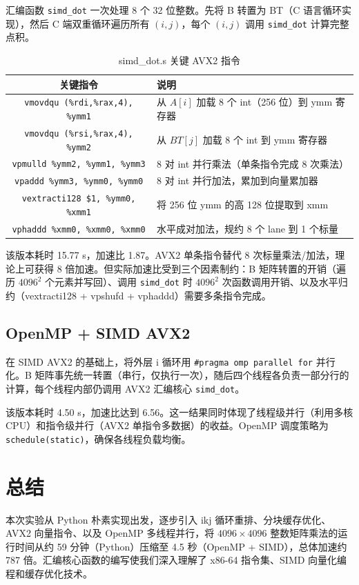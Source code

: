 \documentclass[11pt]{article}
\begin{document}
汇编函数 \texttt{simd\_dot} 一次处理 8 个 32 位整数。先将 B 转置为 BT（C 语言循环实现），然后 C 端双重循环遍历所有 $(i,j)$，每个 $(i,j)$ 调用 \texttt{simd\_dot} 计算完整点积。

\begin{table}[H]
    \centering
    \begin{tabular}{cl}
        \hline
        关键指令 & 说明 \\
        \hline
        \texttt{vmovdqu (\%rdi,\%rax,4), \%ymm1} & 从 $A[i]$ 加载 8 个 int（256 位）到 ymm 寄存器 \\
        \texttt{vmovdqu (\%rsi,\%rax,4), \%ymm2} & 从 $BT[j]$ 加载 8 个 int 到 ymm 寄存器 \\
        \texttt{vpmulld \%ymm2, \%ymm1, \%ymm3} & 8 对 int 并行乘法（单条指令完成 8 次乘法） \\
        \texttt{vpaddd \%ymm3, \%ymm0, \%ymm0} & 8 对 int 并行加法，累加到向量累加器 \\
        \texttt{vextracti128 \$1, \%ymm0, \%xmm1} & 将 256 位 ymm 的高 128 位提取到 xmm \\
        \texttt{vphaddd \%xmm0, \%xmm0, \%xmm0} & 水平成对加法，规约 8 个 lane 到 1 个标量 \\
        \hline
    \end{tabular}
    \caption{simd\_dot.s 关键 AVX2 指令}
\end{table}

该版本耗时 15.77 s，加速比 1.87。AVX2 单条指令替代 8 次标量乘法/加法，理论上可获得 8 倍加速。但实际加速比受到三个因素制约：B 矩阵转置的开销（遍历 $4096^2$ 个元素并写回）、调用 \texttt{simd\_dot} 时 $4096^2$ 次函数调用开销、以及水平归约（vextracti128 + vpshufd + vphaddd）需要多条指令完成。

\subsection{OpenMP + SIMD AVX2}
在 SIMD AVX2 的基础上，将外层 i 循环用 \texttt{\#pragma omp parallel for} 并行化。B 矩阵事先统一转置（串行，仅执行一次），随后四个线程各负责一部分行的计算，每个线程内部仍调用 AVX2 汇编核心 \texttt{simd\_dot}。

该版本耗时 4.50 s，加速比达到 6.56。这一结果同时体现了线程级并行（利用多核 CPU）和指令级并行（AVX2 单指令多数据）的收益。OpenMP 调度策略为 \texttt{schedule(static)}，确保各线程负载均衡。

\section{总结}
本次实验从 Python 朴素实现出发，逐步引入 ikj 循环重排、分块缓存优化、AVX2 向量指令、以及 OpenMP 多线程并行，将 $4096 \times 4096$ 整数矩阵乘法的运行时间从约 59 分钟（Python）压缩至 4.5 秒（OpenMP + SIMD），总体加速约 787 倍。汇编核心函数的编写使我们深入理解了 x86-64 指令集、SIMD 向量化编程和缓存优化技术。
\end{document}
